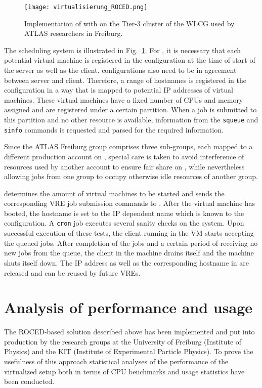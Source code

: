 \begin{figure}

\texttt{[image: virtualisierung\_ROCED.png]}
\caption{Implementation of \Roced with \Slurm on the Tier-3 cluster of
  the WLCG used by ATLAS researchers in Freiburg.}
\label{fig:slurmRocedBFG}
\end{figure}

The scheduling system is illustrated in Fig.~\ref{fig:slurmRocedBFG}.
For \Slurm, it is necessary that each potential virtual
machine is registered in the configuration at the time of start of the
\Slurm server as well as the client. \Slurm configurations also
need to be in agreement between server and client.
Therefore, a range of hostnames is registered in the configuration in
a way that is mapped to potential IP addresses of virtual machines.
These virtual machines have a fixed number of CPUs and memory assigned and are
registered under a certain \Slurm partition.
When a job is submitted to this partition and no other resource is
available, information from the \Slurm \texttt{squeue} and
\texttt{sinfo} commands is requested and parsed for the required information.

Since the ATLAS Freiburg group comprises three sub-groups, each mapped
to a different production account on \NEMO, special care is taken to
avoid interference of resources used by another account to ensure fair share on \NEMO, while
nevertheless allowing jobs from one group to occupy otherwise idle resources of another group.

\Roced determines the amount of virtual machines to be started and sends the
corresponding VRE job submission commands to \Moab.
After the virtual machine has booted, the hostname is set to the IP
dependent name which is known to the \Slurm configuration.
A \texttt{cron} job executes several sanity
checks on the system.
Upon successful execution of these tests, the \Slurm client
running in the VM starts accepting the queued jobs.
After completion of the jobs and a certain period of receiving no new jobs from the queue, the
\Slurm client in the machine drains itself and the machine
shuts itself down.
The IP address as well as the corresponding hostname in \Slurm
are released and can be reused by future VREs.


\section{Analysis of performance and usage}

The ROCED-based solution described above has been implemented and put into production by the research groups at the University of Freiburg (Institute of Physics) and the KIT (Institute of Experimental
Particle Physics). To prove the usefulness of this approach
statistical analyses of the performance of the virtualized setup both
in terms of CPU benchmarks and usage statistics have been conducted.

